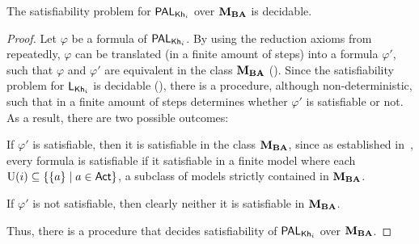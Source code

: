 \begin{corollary}\label{cor:palsat}
The satisfiability problem for $\mathsf{PAL}_{{\sf Kh}_i}$ over $\mathbf{M}_{\mathbf{BA}}$ is decidable.
\end{corollary}
\begin{proof}
Let $\varphi$ be a formula of $\mathsf{PAL}_{{\sf Kh}_i}$. By using the reduction axioms from~ repeatedly, $\varphi$ can be translated (in a finite amount of steps) into a formula $\varphi'$, such that $\varphi$ and $\varphi'$ are equivalent in the class $\mathbf{M}_{\mathbf{BA}}$ (). 
Since the satisfiability problem for $\mathsf{L}_{{\sf Kh}_i}$ is decidable (\cite{AFSVQ21,AFSVQ23report}), there is a procedure, although non-deterministic, such that in a finite amount of steps determines whether $\varphi'$ is satisfiable or not.
As a result, there are two possible outcomes:
\begin{inlineenum}
\item If $\varphi'$ is satisfiable, then it is satisfiable in the class $\mathbf{M}_{\mathbf{BA}}$, since as established in~\cite{AFSVQ21,AFSVQ23report}, every formula is satisfiable if it satisfiable in a finite model where each $\operatorname{U}(i)\subseteq\{ \{ a \} \mid a\in{\rm \sf Act} \}$, a subclass of models strictly contained in $\mathbf{M}_{\mathbf{BA}}$.  
\item If $\varphi'$ is not satisfiable, then clearly neither it is satisfiable in $\mathbf{M}_{\mathbf{BA}}$. %
\end{inlineenum}
Thus, there is a procedure that decides satisfiability of $\mathsf{PAL}_{{\sf Kh}_i}$ over $\mathbf{M}_{\mathbf{BA}}$. 
\end{proof}
